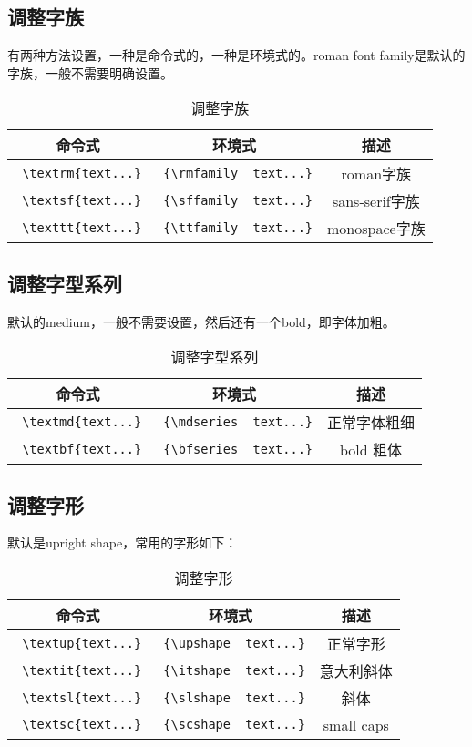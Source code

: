 \subsection{调整字族}
有两种方法设置，一种是命令式的，一种是环境式的。roman font family是默认的字族，一般不需要明确设置。
\begin{table}[h]
\label{tab:调整字族}
\begin{tabular}{|c|c|c|}
\hline
命令式 & 环境式 & 描述 \\
\hline
\verb+ \textrm{text...}+ & \verb+ {\rmfamily  text...}+  & roman字族 \\[5pt]  
\verb+ \textsf{text...}+ & \verb+ {\sffamily  text...}+  & sans-serif字族 \\[5pt]
\verb+ \texttt{text...}+ & \verb+ {\ttfamily  text...}+  & monospace字族 \\
\hline
\end{tabular}
\caption{调整字族}
\end{table}

\subsection{调整字型系列}
默认的medium，一般不需要设置，然后还有一个bold，即字体加粗。
\begin{table}[h]
\label{tab:调整字型系列}
\begin{tabular}{|c|c|c|}
\hline
命令式 & 环境式 & 描述 \\
\hline
\verb+ \textmd{text...}+ & \verb+ {\mdseries  text...}+  & 正常字体粗细 \\  
\verb+ \textbf{text...}+ & \verb+ {\bfseries  text...}+  & bold 粗体 \\
\hline
\end{tabular}
\caption{调整字型系列}
\end{table}


\subsection{调整字形}
默认是upright shape，常用的字形如下：
\begin{table}[h]
\label{tab:调整字形}
\begin{tabular}{|c|c|c|}
\hline
命令式 & 环境式 & 描述 \\
\hline
\verb+ \textup{text...}+ & \verb+ {\upshape  text...}+  & 正常字形 \\  
\verb+ \textit{text...}+ & \verb+ {\itshape  text...}+  & 意大利斜体 \\
\verb+ \textsl{text...}+ & \verb+ {\slshape  text...}+  & 斜体 \\
\verb+ \textsc{text...}+ & \verb+ {\scshape  text...}+  & small caps \\
\hline
\end{tabular}
\caption{调整字形}
\end{table}


